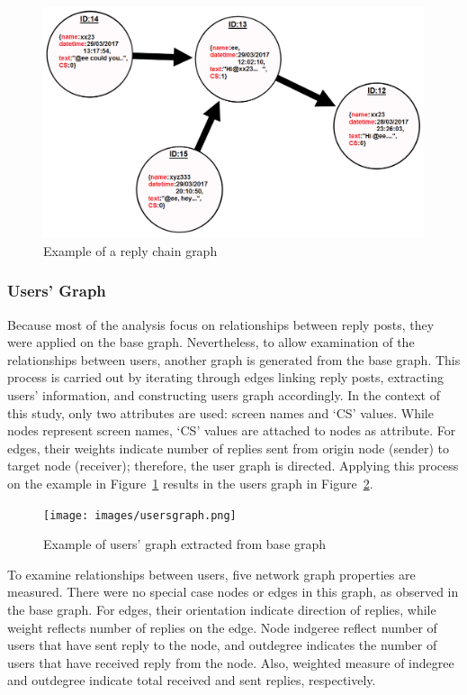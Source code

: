 \documentclass[sigconf]{acmart}
\begin{document}
{\begin{figure}[htb]
\centering
\includegraphics[width=\columnwidth]{images/replychaingraph.png}
\caption{Example of a reply chain graph}
\label{fig:replychaingraph}
\end{figure}

\subsubsection{Users' Graph}

Because most of the analysis focus on relationships between reply
posts, they were applied on the base graph. Nevertheless, to allow
examination of the relationships between users, another graph is
generated from the base graph. This process is carried out by
iterating through edges linking reply posts, extracting users'
information, and constructing users graph accordingly. In the context
of this study, only two attributes are used: screen names and
`CS' values. While nodes represent screen names, `CS' values
are attached to nodes as attribute. For edges, their weights indicate
number of replies sent from origin node (sender) to target node
(receiver); therefore, the user graph is directed. Applying this
process on the example in Figure~\ref{fig:replychaingraph} results in
the users graph in Figure~\ref{fig:usersgraph}.

\begin{figure}[htb]
\centering
\texttt{[image: images/usersgraph.png]}
\caption{Example of users' graph extracted from base graph}
\label{fig:usersgraph}
\end{figure}

To examine relationships between users, five network graph properties
are measured. There were no special case nodes or edges in this graph,
as observed in the base graph. For edges, their orientation indicate
direction of replies, while weight reflects number of replies on the
edge.  Node indgeree reflect number of users that have sent reply to
the node, and outdegree indicates the number of users that have
received reply from the node. Also, weighted measure of indegree and
outdegree indicate total received and sent replies, respectively.

}
\end{document}
